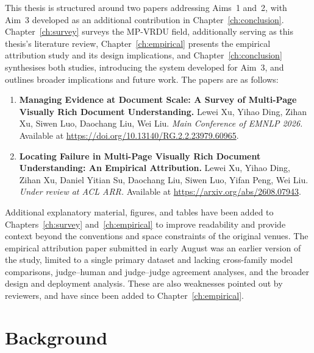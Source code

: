 \documentclass[11pt,twoside,openany]{report}
\begin{document}
This thesis is structured around two papers addressing Aims~1 and~2, with Aim~3 developed as an additional contribution in Chapter~\ref{ch:conclusion}. Chapter~\ref{ch:survey} surveys the MP-VRDU field, additionally serving as this thesis's literature review, Chapter~\ref{ch:empirical} presents the empirical attribution study and its design implications, and Chapter~\ref{ch:conclusion} synthesises both studies, introducing the system developed for Aim~3, and outlines broader implications and future work. The papers are as follows:

\begin{enumerate}
  \item \textbf{Managing Evidence at Document Scale: A Survey of Multi-Page Visually Rich Document Understanding.} Lewei Xu, Yihao Ding, Zihan Xu, Siwen Luo, Daochang Liu, Wei Liu. \emph{Main Conference of EMNLP 2026.} Available at \url{https://doi.org/10.13140/RG.2.2.23979.60965}.
  \item \textbf{Locating Failure in Multi-Page Visually Rich Document Understanding: An Empirical Attribution.} Lewei Xu, Yihao Ding, Zihan Xu, Daniel Yitian Su, Daochang Liu, Siwen Luo, Yifan Peng, Wei Liu. \emph{Under review at ACL ARR.} Available at \url{https://arxiv.org/abs/2608.07943}.
\end{enumerate}

Additional explanatory material, figures, and tables have been added to Chapters~\ref{ch:survey} and~\ref{ch:empirical} to improve readability and provide context beyond the conventions and space constraints of the original venues. The empirical attribution paper submitted in early August was an earlier version of the study, limited to a single primary dataset and lacking cross-family model comparisons, judge--human and judge--judge agreement analyses, and the broader design and deployment analysis. These are also weaknesses pointed out by reviewers, and have since been added to Chapter~\ref{ch:empirical}.

\section{Background}
\label{sec:background}
\end{document}
